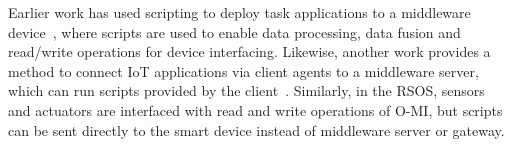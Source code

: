 Earlier work has used scripting to deploy task applications to a middleware device~\cite{MODE_A_Context-Aware_IoT_Middleware_Supporting_On-Demand_Deployment_for_Mobile_Devices}, where scripts are used to enable data processing, data fusion and read/write operations for device interfacing. Likewise, another work provides a method to connect IoT applications via client agents to a middleware server, which can run scripts provided by the client~\cite{ScriptIoT_A_Script_Framework_for_and_Internet-of-Things_Applications}. Similarly, in the RSOS, sensors and actuators are interfaced with read and write operations of O-MI, but scripts can be sent directly to the smart device instead of middleware server or gateway. %





